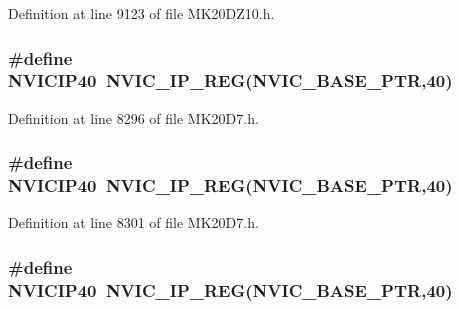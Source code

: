 Definition at line 9123 of file M\+K20\+D\+Z10.\+h.

\subsubsection[{\texorpdfstring{N\+V\+I\+C\+I\+P40}{NVICIP40}}]{\setlength{\rightskip}{0pt plus 5cm}\#define N\+V\+I\+C\+I\+P40~{\bf N\+V\+I\+C\+\_\+\+I\+P\+\_\+\+R\+EG}({\bf N\+V\+I\+C\+\_\+\+B\+A\+S\+E\+\_\+\+P\+TR},40)}\hypertarget{group___n_v_i_c___register___accessor___macros_ga8fa1e6315d454cd3b4b3c2d4ff5cd805}{}\label{group___n_v_i_c___register___accessor___macros_ga8fa1e6315d454cd3b4b3c2d4ff5cd805}


Definition at line 8296 of file M\+K20\+D7.\+h.

\subsubsection[{\texorpdfstring{N\+V\+I\+C\+I\+P40}{NVICIP40}}]{\setlength{\rightskip}{0pt plus 5cm}\#define N\+V\+I\+C\+I\+P40~{\bf N\+V\+I\+C\+\_\+\+I\+P\+\_\+\+R\+EG}({\bf N\+V\+I\+C\+\_\+\+B\+A\+S\+E\+\_\+\+P\+TR},40)}\hypertarget{group___n_v_i_c___register___accessor___macros_ga8fa1e6315d454cd3b4b3c2d4ff5cd805}{}\label{group___n_v_i_c___register___accessor___macros_ga8fa1e6315d454cd3b4b3c2d4ff5cd805}


Definition at line 8301 of file M\+K20\+D7.\+h.

\subsubsection[{\texorpdfstring{N\+V\+I\+C\+I\+P40}{NVICIP40}}]{\setlength{\rightskip}{0pt plus 5cm}\#define N\+V\+I\+C\+I\+P40~{\bf N\+V\+I\+C\+\_\+\+I\+P\+\_\+\+R\+EG}({\bf N\+V\+I\+C\+\_\+\+B\+A\+S\+E\+\_\+\+P\+TR},40)}\hypertarget{group___n_v_i_c___register___accessor___macros_ga8fa1e6315d454cd3b4b3c2d4ff5cd805}{}\label{group___n_v_i_c___register___accessor___macros_ga8fa1e6315d454cd3b4b3c2d4ff5cd805}


